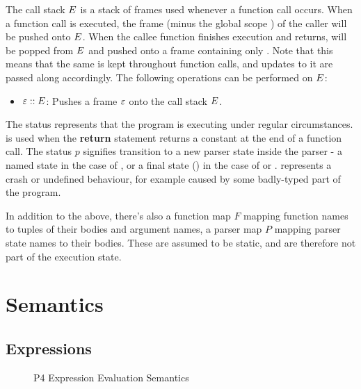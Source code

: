 \documentclass[UTF8]{article}
\begin{document}
The call stack $E$ is a stack of frames used whenever a function call occurs. When a function call is executed, the frame \currsf{} (minus the global scope \gscope{}) of the caller will be pushed onto $E$. When the callee function finishes execution and returns, \currsf{} will be popped from $E$ and pushed onto a frame containing only \gscope{}. Note that this means that the same \gscope{} is kept throughout function calls, and updates to it are passed along accordingly. The following operations can be performed on $E$: 
\begin{itemize}
\item $ \varepsilon :: E$: Pushes a frame $\varepsilon$ onto the call stack $E$.
\end{itemize}

The status \running{} represents that the program is executing under regular circumstances.  is used when the \textbf{return} statement returns a constant \cval{} at the end of a function call. The status $p$ signifies transition to a new parser state inside the parser - a named state in the case of \trans{\vn{}}, or a final state (\pfin{}) in the case of \accept{} or \reject{}. \sterr{} represents a crash or undefined behaviour, for example caused by some badly-typed part of the program. 

In addition to the above, there's also a function map $F$ mapping function names to tuples of their bodies and argument names, a parser map $P$ mapping parser state names to their bodies. These are assumed to be static, and are therefore not part of the execution state.

\section{Semantics}
\subsection{Expressions}

\begin{figure}[ht!]
\caption{P4 Expression Evaluation Semantics}
\label{fig:semexp}
\end{figure}
\newcommand{\expr}{\ensuremath{e}}
\end{document}

